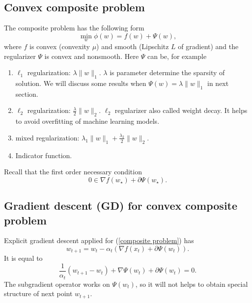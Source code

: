 \subsection{Convex composite problem}
The composite problem has the following form
\begin{equation}\label{composite problem}
	\min_w \phi(w)=f(w)+\Psi(w),
\end{equation}
where $f$ is convex (convexity $\mu$) and smooth (Lipschitz $L$ of gradient) and the regularizer $\Psi$ is convex and nonsmooth.
Here $\Psi$ can be, for example
\begin{enumerate}
	\item $\ell_1$ regularization: $\lambda \|w\|_1$.
	$\lambda$ is parameter determine the sparsity of solution.
	We will discuss some results when $\Psi(w)=\lambda \|w\|_1$ in next section.
	\item $\ell_2$ regularization: $\frac{\lambda}{2} \|w\|_2$. $\ell_2$ regularizer also called weight decay.
	It helps to avoid overfitting of machine learning models.
	\item mixed regularization: $\lambda_1 \|w\|_1 + \frac{\lambda_2}{2} \|w\|_2$.
	\item Indicator function.
\end{enumerate}

Recall that the first order necessary condition
\begin{equation}
	0 \in \nabla f(w_\star) + \partial \Psi(w_\star).
\end{equation}
\subsection{Gradient descent (GD) for convex composite problem}
Explicit gradient descent applied for (\ref{composite problem}) has
\begin{equation}
	w_{t+1} = w_t -\alpha_t (\nabla f(x_t) + \partial \Psi(w_{t})).
\end{equation}
It is equal to
\begin{equation}
	\frac{1}{\alpha_t} (w_{t+1}-w_t) +\nabla \Psi(w_t) + \partial \Psi(w_{t})=0.
\end{equation}
The subgradient operator works on $\Psi(w_t)$, so it will not helps to obtain special structure of next point $w_{t+1}$.

